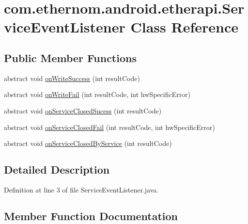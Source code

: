 \hypertarget{classcom_1_1ethernom_1_1android_1_1etherapi_1_1_service_event_listener}{}\section{com.\+ethernom.\+android.\+etherapi.\+Service\+Event\+Listener Class Reference}
\label{classcom_1_1ethernom_1_1android_1_1etherapi_1_1_service_event_listener}
\subsection*{Public Member Functions}
\begin{DoxyCompactItemize}
\item 
abstract void \mbox{\hyperlink{classcom_1_1ethernom_1_1android_1_1etherapi_1_1_service_event_listener_a6cf06ce0cc98b8f1737a489b2bc32a1e}{on\+Write\+Success}} (int result\+Code)
\item 
abstract void \mbox{\hyperlink{classcom_1_1ethernom_1_1android_1_1etherapi_1_1_service_event_listener_acf961399818810ec7d8ff65df313d5c9}{on\+Write\+Fail}} (int result\+Code, int hw\+Specific\+Error)
\item 
abstract void \mbox{\hyperlink{classcom_1_1ethernom_1_1android_1_1etherapi_1_1_service_event_listener_aaf244d10f7065c07544986fd27e7155b}{on\+Service\+Closed\+Sucess}} (int result\+Code)
\item 
abstract void \mbox{\hyperlink{classcom_1_1ethernom_1_1android_1_1etherapi_1_1_service_event_listener_a52749598e9ee897eb0c27fccfb7153ef}{on\+Service\+Closed\+Fail}} (int result\+Code, int hw\+Specific\+Error)
\item 
abstract void \mbox{\hyperlink{classcom_1_1ethernom_1_1android_1_1etherapi_1_1_service_event_listener_a59f8fd8486ac0ef8c5ec1ba0ca69c41b}{on\+Service\+Closed\+By\+Service}} (int result\+Code)
\end{DoxyCompactItemize}


\subsection{Detailed Description}


Definition at line 3 of file Service\+Event\+Listener.\+java.



\subsection{Member Function Documentation}
\mbox{\label{classcom_1_1ethernom_1_1android_1_1etherapi_1_1_service_event_listener_a59f8fd8486ac0ef8c5ec1ba0ca69c41b}} 
